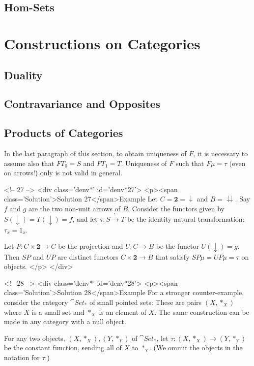 \section{Hom-Sets}

\chapter{Constructions on Categories}

\section{Duality}

\section{Contravariance and Opposites}

\section{Products of Categories}
In the last paragraph of this section, to obtain uniqueness of $F$, it is necessary to assume also that $FT_0=S$ and $FT_1=T$. Uniqueness of $F$ such that $F\mu=\tau$ (even on arrows!) only is not valid in general.

<!-- 27 -->
<div class='denv*' id='denv*27'>
<p><span class='Solution'>Solution 27</span>{Example}
	Let $C=\mathbf{2}=\downarrow$ and $B=\downdownarrows$. Say $f$ and $g$ are the two non-unit arrows of $B$. Consider the functors given by $S(\downarrow)=T(\downarrow)=f$, and let $\tau:S\dot{\to}T$ be the identity natural transformation: $\tau_x=1_x$.

	Let $P:C\times\mathbf{2}\to C$ be the projection and $U:C\to B$ be the functor $U(\downarrow)=g$. Then $SP$ and $UP$ are distinct functors $C\times\mathbf{2}\to B$ that satisfy $SP\mu=UP\mu=\tau$ on objects.
</p>
</div>

<!-- 28 -->
<div class='denv*' id='denv*28'>
<p><span class='Solution'>Solution 28</span>{Example}
	For a stronger counter-example, consider the category $\cat{Set}_*$ of small pointed sets: These are pairs $(X,\ast_X)$ where $X$ is a small set and $\ast_X$ is an element of $X$. The same construction can be made in any category with a null object.
	
	For any two objects, $(X,\ast_X),(Y,\ast_Y)$ of $\cat{Set}_\ast$, let $\tau\colon (X,\ast_X)\to(Y,\ast_Y)$ be the constant function, sending all of $X$ to $\ast_Y$. (We ommit the objects in the notation for $\tau$.)
	
